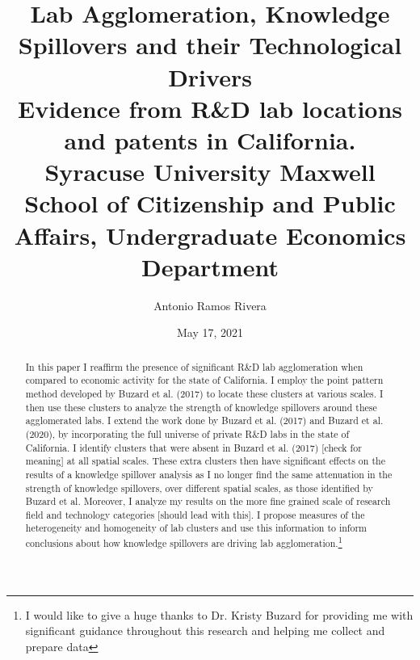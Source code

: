 \documentclass[12pt,letterpaper]{article}
\begin{document}
\title{\textbf{Lab Agglomeration, Knowledge Spillovers and their Technological Drivers}\\{\small \textbf{Evidence from R\&D lab locations and patents in California.}}\\{\small \textbf{Syracuse University Maxwell School of Citizenship and Public Affairs, Undergraduate Economics Department}}}
\author{Antonio Ramos Rivera}
\date{May 17, 2021}
\maketitle
\begin{abstract}
In this paper I reaffirm the presence of significant R\&D lab agglomeration when compared to economic activity for the state of California. I employ the point pattern method developed by Buzard et al. (2017) to locate these clusters at various scales. I then use these clusters to analyze the strength of knowledge spillovers around these agglomerated labs. I extend the work done by Buzard et al. (2017) and Buzard et al. (2020), by incorporating the full universe of private R\&D labs in the state of California. I identify clusters that were absent in Buzard et al. (2017) [{\color{red}check for meaning}] at all spatial scales. These extra clusters then have significant effects on the results of a knowledge spillover analysis as I no longer find the same attenuation in the strength of knowledge spillovers, over different spatial scales, as those identified by Buzard et al. Moreover, I analyze my results on the more fine grained scale of research field and technology categories [{\color{red}should lead with this}]. I propose measures of the heterogeneity and homogeneity of lab clusters and use this information to inform conclusions about how knowledge spillovers are driving lab agglomeration.\footnote{I would like to give a huge thanks to Dr. Kristy Buzard for providing me with significant guidance throughout this research and helping me collect and prepare data} 
\end{abstract}
\end{document}
